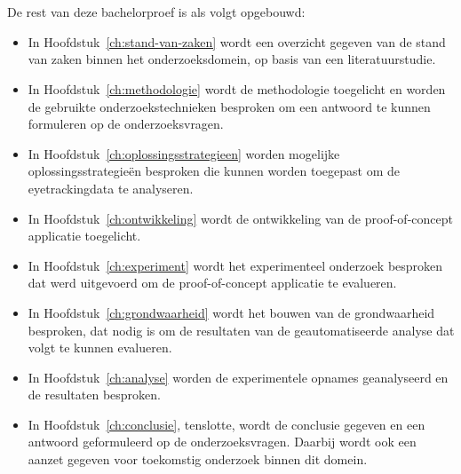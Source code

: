 \section{}%
\label{sec:opzet-bachelorproef}


De rest van deze bachelorproef is als volgt opgebouwd:
\begin{itemize}
  \item In Hoofdstuk~\ref{ch:stand-van-zaken} wordt een overzicht gegeven van de stand van zaken binnen het onderzoeksdomein, op basis van een literatuurstudie.
  \item In Hoofdstuk~\ref{ch:methodologie} wordt de methodologie toegelicht en worden de gebruikte onderzoekstechnieken besproken om een antwoord te kunnen formuleren op de onderzoeksvragen.
  \item In Hoofdstuk~\ref{ch:oplossingsstrategieen} worden mogelijke oplossingsstrategieën besproken die kunnen worden toegepast om de eyetrackingdata te analyseren.
  \item In Hoofdstuk~\ref{ch:ontwikkeling} wordt de ontwikkeling van de proof-of-concept applicatie toegelicht.
  \item In Hoofdstuk~\ref{ch:experiment} wordt het experimenteel onderzoek besproken dat werd uitgevoerd om de proof-of-concept applicatie te evalueren.
  \item In Hoofdstuk~\ref{ch:grondwaarheid} wordt het bouwen van de grondwaarheid besproken, dat nodig is om de resultaten van de geautomatiseerde analyse dat volgt te kunnen evalueren.
  \item In Hoofdstuk~\ref{ch:analyse} worden de experimentele opnames geanalyseerd en de resultaten besproken.
  \item In Hoofdstuk~\ref{ch:conclusie}, tenslotte, wordt de conclusie gegeven en een antwoord geformuleerd op de onderzoeksvragen. Daarbij wordt ook een aanzet gegeven voor toekomstig onderzoek binnen dit domein.
\end{itemize}